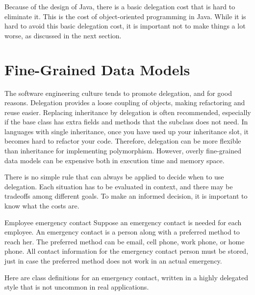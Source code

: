 Because of the design of Java, there is a basic delegation cost that is hard to eliminate it. This is the cost of object-oriented programming in Java. While it is hard to avoid this basic delegation cost, it is important not to make things a lot worse, as discussed in the next section. 

\section{Fine-Grained Data Models}
\label{fine-grained-data-models}

The software engineering culture tends to promote delegation, and for good reasons. Delegation provides a loose coupling of objects, making refactoring and reuse easier. Replacing inheritance by delegation is often recommended, especially if the base class has extra fields and methods that the subclass does not need. In languages with single inheritance, once you have used up your inheritance slot, it becomes hard to refactor your code. Therefore, delegation can be more flexible than inheritance for implementing polymorphism. However, overly fine-grained data models can be expensive both in execution time and memory space. 

There is no simple rule that can always be applied to decide when to use delegation. Each situation has to be evaluated in context, and there may be tradeoffs among different goals. To make an informed decision, it is important to know what the costs are.

\begin{example}{Employee emergency contact} 
Suppose an emergency contact is needed for each employee. An emergency contact is a person along with a preferred method to reach her.  The preferred method can be email, cell phone, work phone, or home phone. All contact information for the emergency contact person must be stored, just in case the preferred method does not work in an actual emergency. 
\end{example}

Here are class definitions for an emergency contact, written in a highly delegated style that is not uncommon in real applications. 

